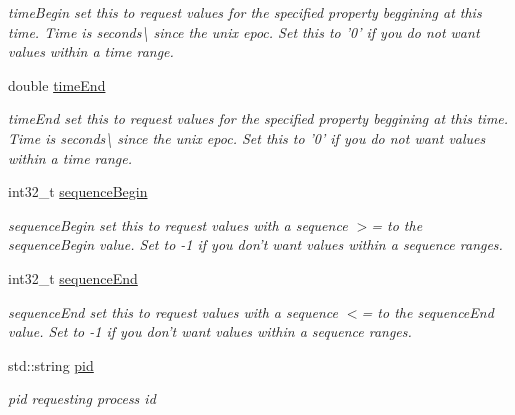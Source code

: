 \begin{DoxyCompactItemize}
\begin{DoxyCompactList}\small\item\em time\-Begin set this to request values for the specified property beggining at this time. Time is seconds\textbackslash{} since the unix epoc. Set this to '0' if you do not want values within a time range. \end{DoxyCompactList}\item 
\hypertarget{classAsyncRangePropertyRequest_acd2a28137c227b0fb6a51576d84f5f30}{double \hyperlink{classAsyncRangePropertyRequest_acd2a28137c227b0fb6a51576d84f5f30}{time\-End}}\label{classAsyncRangePropertyRequest_acd2a28137c227b0fb6a51576d84f5f30}

\begin{DoxyCompactList}\small\item\em time\-End set this to request values for the specified property beggining at this time. Time is seconds\textbackslash{} since the unix epoc. Set this to '0' if you do not want values within a time range. \end{DoxyCompactList}\item 
\hypertarget{classAsyncRangePropertyRequest_a024dab8e12c45ea8988b7f3e4b3c85c0}{int32\-\_\-t \hyperlink{classAsyncRangePropertyRequest_a024dab8e12c45ea8988b7f3e4b3c85c0}{sequence\-Begin}}\label{classAsyncRangePropertyRequest_a024dab8e12c45ea8988b7f3e4b3c85c0}

\begin{DoxyCompactList}\small\item\em sequence\-Begin set this to request values with a sequence $>$= to the sequence\-Begin value. Set to -\/1 if you don't want values within a sequence ranges. \end{DoxyCompactList}\item 
\hypertarget{classAsyncRangePropertyRequest_a352afdecef1d1e6fc1f82384d0c9edfe}{int32\-\_\-t \hyperlink{classAsyncRangePropertyRequest_a352afdecef1d1e6fc1f82384d0c9edfe}{sequence\-End}}\label{classAsyncRangePropertyRequest_a352afdecef1d1e6fc1f82384d0c9edfe}

\begin{DoxyCompactList}\small\item\em sequence\-End set this to request values with a sequence $<$= to the sequence\-End value. Set to -\/1 if you don't want values within a sequence ranges. \end{DoxyCompactList}\item 
\hypertarget{classAsyncRangePropertyRequest_ab93b9cc82ead929a6e1f72be699fbb6c}{std\-::string \hyperlink{classAsyncRangePropertyRequest_ab93b9cc82ead929a6e1f72be699fbb6c}{pid}}\label{classAsyncRangePropertyRequest_ab93b9cc82ead929a6e1f72be699fbb6c}

\begin{DoxyCompactList}\small\item\em pid requesting process id \end{DoxyCompactList}\end{DoxyCompactItemize}


